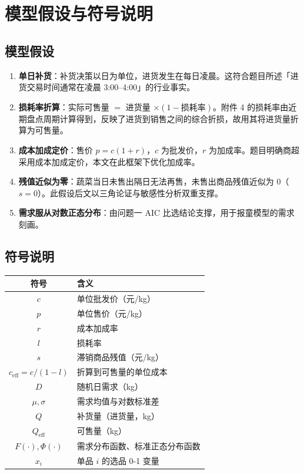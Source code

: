 \documentclass[12pt]{ctexart}
\begin{document}
\section{模型假设与符号说明}

\subsection{模型假设}
\begin{enumerate}
\item \textbf{单日补货}：补货决策以日为单位，进货发生在每日凌晨。这符合题目所述「进货交易时间通常在凌晨 3:00--4:00」的行业事实。
\item \textbf{损耗率折算}：实际可售量 $=$ 进货量 $\times (1-\text{损耗率})$。附件 4 的损耗率由近期盘点周期计算得到，反映了进货到销售之间的综合折损，故用其将进货量折算为可售量。
\item \textbf{成本加成定价}：售价 $p = c(1+r)$，$c$ 为批发价，$r$ 为加成率。题目明确商超采用成本加成定价，本文在此框架下优化加成率。
\item \textbf{残值近似为零}：蔬菜当日未售出隔日无法再售，未售出商品残值近似为 0（$s=0$）。此假设后文以三角论证与敏感性分析双重支撑。
\item \textbf{需求服从对数正态分布}：由问题一 AIC 比选结论支撑，用于报童模型的需求刻画。
\end{enumerate}

\subsection{符号说明}
\begin{center}
\begin{tabular}{cl}
\toprule
符号 & 含义 \\
\midrule
$c$ & 单位批发价（元/kg）\\
$p$ & 单位售价（元/kg）\\
$r$ & 成本加成率\\
$l$ & 损耗率\\
$s$ & 滞销商品残值（元/kg）\\
$c_{\mathrm{eff}}=c/(1-l)$ & 折算到可售量的单位成本\\
$D$ & 随机日需求（kg）\\
$\mu,\sigma$ & 需求均值与对数标准差\\
$Q$ & 补货量（进货量，kg）\\
$Q_{\mathrm{eff}}$ & 可售量（kg）\\
$F(\cdot),\Phi(\cdot)$ & 需求分布函数、标准正态分布函数\\
$x_i$ & 单品 $i$ 的选品 0-1 变量\\
\bottomrule
\end{tabular}
\end{center}
\end{document}
